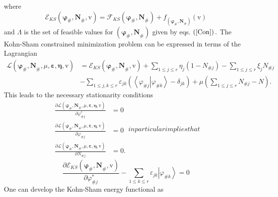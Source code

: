 \documentclass[aps,preprint]{revtex4}%
\begin{document}
where
\begin{equation}
\mathcal{E}_{KS}\left(  \mathbf{\varphi}_{\#}\mathbf{,N}_{\#}\mathbf{,}%
\mathrm{v}\right)  =\mathcal{F}_{KS}\left(  \mathbf{\varphi}_{\#}%
\mathbf{,N}_{\#}\right)  +f_{\left(  \mathbf{\varphi}_{\#}\mathbf{,N}%
_{\#}\right)  }\left(  \mathrm{v}\right)
\end{equation}
and $\mathcal{\Lambda}$ is the set of feasible values for $\left(
\mathbf{\varphi}_{\#}\mathbf{,N}_{\#}\right)  $ given by eqs. $\left(
\ref{Con}\right)  .$ The Kohn-Sham constrained minimization problem can be
expressed in terms of the Lagrangian
\begin{align}
\mathcal{L}\left(  \mathbf{\varphi}_{\#}\mathbf{,N}_{\#},\mu
,\mathbf{\varepsilon,\eta,}\mathrm{v}\right)   &  =\mathcal{E}_{KS}\left(
\mathbf{\varphi}_{\#}\mathbf{,N}_{\#}\mathbf{,}\mathrm{v}\right)  +\sum_{1\leq
j\leq r}\eta_{j}\left(  1-N_{\#j}\right)  -\sum_{1\leq j\leq r}\xi_{j}%
N_{\#j}\\
&  -\sum_{1\leq j,k\leq r}\varepsilon_{jk}\left(  \left\langle \left.
\varphi_{\#j}\right\vert \varphi_{\#k}\right\rangle -\delta_{jk}\right)
+\mu\left(  \sum_{1\leq j\leq r}N_{\#j}-N\right)  .
\end{align}
This leads to the necessary stationarity conditions
\begin{subequations}
\begin{align}
\frac{\partial\mathcal{L}\left(  \mathbf{\varphi}_{\#}\mathbf{,N}_{\#}%
,\mu,\mathbf{\varepsilon,\eta,}\mathrm{v}\right)  }{\partial\varphi
_{\#j}^{\ast}}  &  =0\\
\frac{\partial\mathcal{L}\left(  \mathbf{\varphi}_{\#}\mathbf{,N}_{\#}%
,\mu,\mathbf{\varepsilon,\eta,}\mathrm{v}\right)  }{\partial\varphi_{\#j}}  &
=0\\
\frac{\partial\mathcal{L}\left(  \mathbf{\varphi}_{\#}\mathbf{,N}_{\#}%
,\mu,\mathbf{\varepsilon,\eta,}\mathrm{v}\right)  }{\partial N_{\#j}}  &  =0.
\end{align}
in particular implies that
\end{subequations}
\begin{equation}
\frac{\partial\mathcal{E}_{KS}\left(  \mathbf{\varphi}_{\#}\mathbf{,N}%
_{\#}\mathbf{,}\mathrm{v}\right)  }{\partial\varphi_{\#j}^{\ast}}-\sum_{1\leq
k\leq r}\varepsilon_{jk}\left\vert \varphi_{\#k}\right\rangle =0
\end{equation}
One can develop the Kohn-Sham energy functional as%
\end{document}

